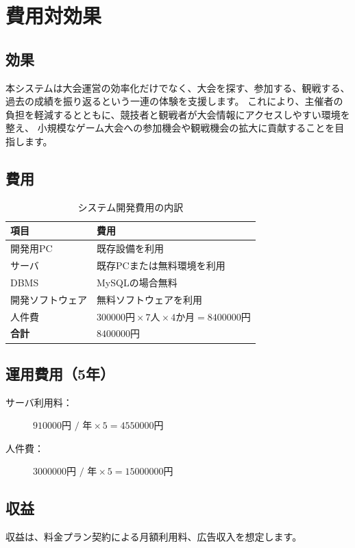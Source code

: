 \section{費用対効果}

\subsection{効果}
本システムは大会運営の効率化だけでなく、大会を探す、参加する、観戦する、過去の成績を振り返るという一連の体験を支援します。
これにより、主催者の負担を軽減するとともに、競技者と観戦者が大会情報にアクセスしやすい環境を整え、
小規模なゲーム大会への参加機会や観戦機会の拡大に貢献することを目指します。

\subsection{費用}
\begin{table}[htbp]
    \centering
    \caption{システム開発費用の内訳}
    \begin{tabular}{|l|l|}
        \hline
        項目 & 費用 \\ \hline
        開発用PC & 既存設備を利用 \\ \hline
        サーバ & 既存PCまたは無料環境を利用 \\ \hline
        DBMS & MySQLの場合無料 \\ \hline
        開発ソフトウェア & 無料ソフトウェアを利用 \\ \hline
        人件費 & $\num{300000} \text{円} \times 7 \text{人} \times 4 \text{か月} = \num{8400000} \text{円}$ \\ \hline
        \textbf{合計} & $\num{8400000} \text{円}$ \\ \hline
    \end{tabular}
\end{table}

\subsection{運用費用（5年）}
\begin{description}
    \item[サーバ利用料：]$\num{910000} \text{円 / 年} \times 5 = \num{4550000} \text{円}$
    \item[人件費：] $\num{3000000} \text{円 / 年} \times 5 = \num{15000000} \text{円}$ 
\end{description}

\subsection{収益}
収益は、料金プラン契約による月額利用料、広告収入を想定します。

